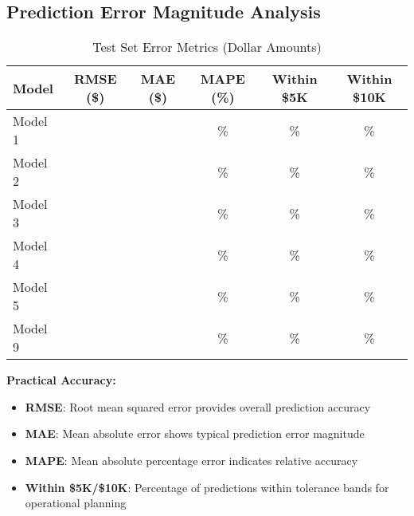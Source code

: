 
\subsection{Prediction Error Magnitude Analysis}

\begin{table}[h!]
\centering
\caption{Test Set Error Metrics (Dollar Amounts)}
\label{tab:error_magnitude}
\begin{tabular}{lccccc}
\toprule
\textbf{Model} & \textbf{RMSE (\$)} & \textbf{MAE (\$)} & \textbf{MAPE (\%)} & \textbf{Within \$5K} & \textbf{Within \$10K} \\
\midrule
Model 1 & \ModelOneRMSETest{} & \ModelOneMAETest{} & \ModelOneMAPETest{}\% & \ModelOneWithinFiveK{}\% & \ModelOneWithinTenK{}\% \\
Model 2 & \ModelTwoRMSETest{} & \ModelTwoMAETest{} & \ModelTwoMAPETest{}\% & \ModelTwoWithinFiveK{}\% & \ModelTwoWithinTenK{}\% \\
Model 3 & \ModelThreeRMSETest{} & \ModelThreeMAETest{} & \ModelThreeMAPETest{}\% & \ModelThreeWithinFiveK{}\% & \ModelThreeWithinTenK{}\% \\
Model 4 & \ModelFourRMSETest{} & \ModelFourMAETest{} & \ModelFourMAPETest{}\% & \ModelFourWithinFiveK{}\% & \ModelFourWithinTenK{}\% \\
Model 5 & \ModelFiveRMSETest{} & \ModelFiveMAETest{} & \ModelFiveMAPETest{}\% & \ModelFiveWithinFiveK{}\% & \ModelFiveWithinTenK{}\% \\
Model 9 & \ModelNineRMSETest{} & \ModelNineMAETest{} & \ModelNineMAPETest{}\% & \ModelNineWithinFiveK{}\% & \ModelNineWithinTenK{}\% \\
\bottomrule
\end{tabular}
\end{table}

\textbf{Practical Accuracy:}
\begin{itemize}
    \item \textbf{RMSE}: Root mean squared error provides overall prediction accuracy
    \item \textbf{MAE}: Mean absolute error shows typical prediction error magnitude
    \item \textbf{MAPE}: Mean absolute percentage error indicates relative accuracy
    \item \textbf{Within \$5K/\$10K}: Percentage of predictions within tolerance bands for operational planning
\end{itemize}


